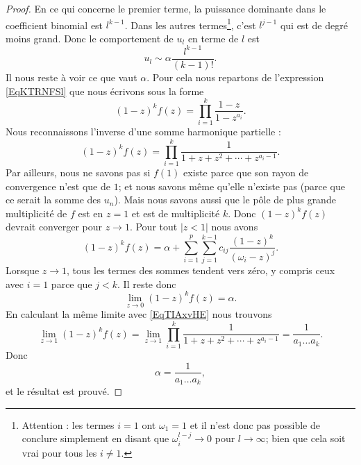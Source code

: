 \begin{proof}
    En ce qui concerne le premier terme, la puissance dominante dans le coefficient binomial est \( l^{k-1}\). Dans les autres termes\footnote{Attention : les termes \( i=1\) ont \( \omega_1=1\) et il n'est donc pas possible de conclure simplement en disant que \( \omega_i^{l-j}\to 0\) pour \( l\to \infty\); bien que cela soit vrai pour tous les \( i\neq 1\).}, c'est \( l^{j-1}\) qui est de degré moins grand. Donc le comportement de \( u_l\) en terme de \( l\) est
    \begin{equation}
        u_l\sim \alpha\frac{ l^{k-1} }{ (k-1)! }.
    \end{equation}
    Il nous reste à voir ce que vaut \( \alpha\). Pour cela nous repartons de l'expression \ref{EqKTRNFSl} que nous écrivons sous la forme
    \begin{equation}
        (1-z)^kf(z)=\prod_{i=1}^{k}\frac{ 1-z }{ 1-z^{a_i} }.
    \end{equation}
    Nous reconnaissons l'inverse d'une somme harmonique partielle :
    \begin{equation}    \label{EqTIAxvHE}
        (1-z)^kf(z)=\prod_{i=1}^k\frac{1}{ 1+z+z^2+\cdots +z^{a_i-1} }.
    \end{equation}
    Par ailleurs, nous ne savons pas si \( f(1)\) existe parce que son rayon de convergence n'est que de \( 1\); et nous savons même qu'elle n'existe pas (parce que ce serait la somme des \( u_n\)). Mais nous savons aussi que le pôle de plus grande multiplicité de \( f\) est en \( z=1\) et est de multiplicité \( k\). Donc \( (1-z)^kf(z)\) devrait converger pour \( z\to 1\). Pour tout \( | z<1 |\) nous avons
    \begin{equation}
        (1-z)^kf(z)=\alpha+\sum_{i=1}^p\sum_{j=1}^{k-1}c_{ij}\frac{ (1-z)^k }{ (\omega_i-z)^j }.
    \end{equation}
    Lorsque \( z\to 1\), tous les termes des sommes tendent vers zéro, y compris ceux avec \( i=1\) parce que \( j<k\). Il reste donc
    \begin{equation}
        \lim_{z\to 0} (1-z)^kf(z)=\alpha.
    \end{equation}
    En calculant la même limite avec \eqref{EqTIAxvHE} nous trouvons
    \begin{equation}
        \lim_{z\to 1}(1-z)^kf(z)=\lim_{z\to 1}\prod_{i=1}^k\frac{1}{ 1+z+z^2+\cdots +z^{a_i-1} }=\frac{1}{ a_1\ldots a_k }.
    \end{equation}
    Donc
    \begin{equation}
        \alpha=\frac{1}{ a_1\ldots a_k },
    \end{equation}
    et le résultat est prouvé.
    
\end{proof}


